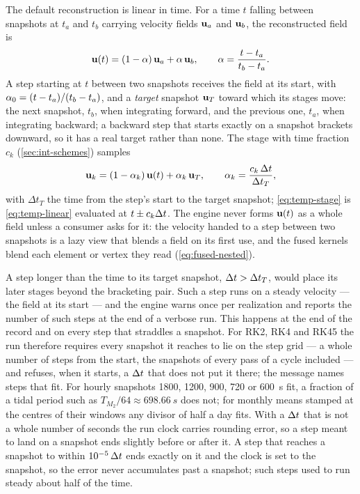 The default reconstruction is linear in time. For a time $t$ falling between snapshots at $t_a$ and $t_b$
carrying velocity fields $\mathbf{u}_a$ and $\mathbf{u}_b$, the reconstructed field is
\begin{equation}\label{eq:temp-linear}
  \mathbf{u}(t) = (1-\alpha)\,\mathbf{u}_a + \alpha\,\mathbf{u}_b, \qquad
  \alpha = \frac{t-t_a}{t_b-t_a}.
\end{equation}
A step starting at $t$ between two snapshots receives the field at its start, with
$\alpha_0=(t-t_a)/(t_b-t_a)$, and a \emph{target} snapshot $\mathbf{u}_T$ toward which its stages
move: the next snapshot, $t_b$, when integrating forward, and the previous one, $t_a$, when integrating
backward; a backward step that starts exactly on a snapshot brackets downward, so it has a real target
rather than none. The stage with time fraction $c_k$ (\cref{sec:int-schemes}) samples
\begin{equation}\label{eq:temp-stage}
  \mathbf{u}_k=(1-\alpha_k)\,\mathbf{u}(t)+\alpha_k\,\mathbf{u}_T,\qquad
  \alpha_k=\frac{c_k\,\Delta t}{\Delta t_T},
\end{equation}
with $\Delta t_T$ the time from the step's start to the target snapshot; \cref{eq:temp-stage} is
\cref{eq:temp-linear} evaluated at $t\pm c_k\Delta t$. The engine never forms $\mathbf{u}(t)$ as a whole field
unless a consumer asks for it: the velocity handed to a step between two snapshots is a lazy view that
blends a field on its first use, and the fused kernels blend each element or vertex they read
(\cref{eq:fused-nested}).

A step longer than the time to its target snapshot, $\Delta t>\Delta t_T$, would place its later stages
beyond the bracketing pair. Such a step runs on a steady velocity --- the field at its start --- and the
engine warns once per realization and reports the number of such steps at the end of a verbose run.
This happens at the end of the record and on every step that straddles a snapshot. For RK2, RK4
and RK45 the run therefore requires every snapshot it reaches to lie on the step grid --- a whole
number of steps from the start, the snapshots of every pass of a cycle included --- and
refuses, when it starts, a $\Delta t$ that does not put it there; the message names steps that fit. For
hourly snapshots 1800, 1200, 900, 720 or \SI{600}{s} fit, a fraction of a tidal period such as
$T_{M_2}/64\approx\SI{698.66}{s}$ does not; for monthly means stamped at the centres of their
windows any divisor of half a day fits. With a $\Delta t$ that is not a whole number of seconds the run
clock carries rounding error, so a step meant to land on a snapshot ends slightly before or after it.
A step that reaches a snapshot to within $10^{-5}\,\Delta t$ ends exactly on it and the clock is set to the
snapshot, so the error never accumulates past a snapshot; such steps used to run steady about half of
the time.

